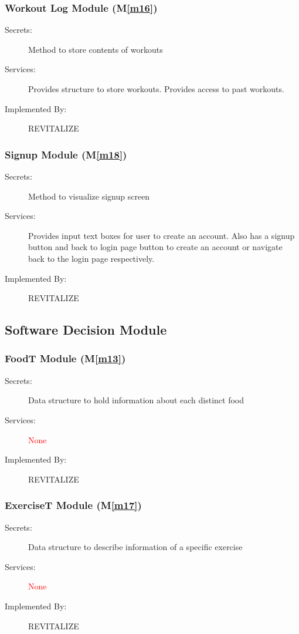\documentclass[12pt, titlepage]{article}
\newcommand{\mref}[1]{M\ref{#1}}
\begin{document}
\subsubsection{Workout Log Module (\mref{m16})}
\begin{description}
	\item[Secrets:]Method to store contents of workouts
	\item[Services:]Provides structure to store workouts. Provides access to past workouts.
	\item[Implemented By:] REVITALIZE
\end{description}

\subsubsection{Signup Module (\mref{m18})}
\begin{description}
	\item[Secrets:]Method to visualize signup screen 
	\item[Services:]Provides input text boxes for user to create an account. Also has a signup button and back to login page button to create an account or navigate back to the login page respectively.
	\item[Implemented By:] REVITALIZE
\end{description}


\subsection{Software Decision Module}

\subsubsection{FoodT Module (\mref{m13})}
\begin{description}
	\item[Secrets:] Data structure to hold information about each distinct food
	\item[Services:] \textcolor{red}{None}
	\item[Implemented By:] REVITALIZE
\end{description}

\subsubsection{ExerciseT Module (\mref{m17})}
\begin{description}
	\item[Secrets:]Data structure to describe information of a specific exercise
	\item[Services:] \textcolor{red}{None}
	\item[Implemented By:] REVITALIZE
\end{description}
\end{document}
